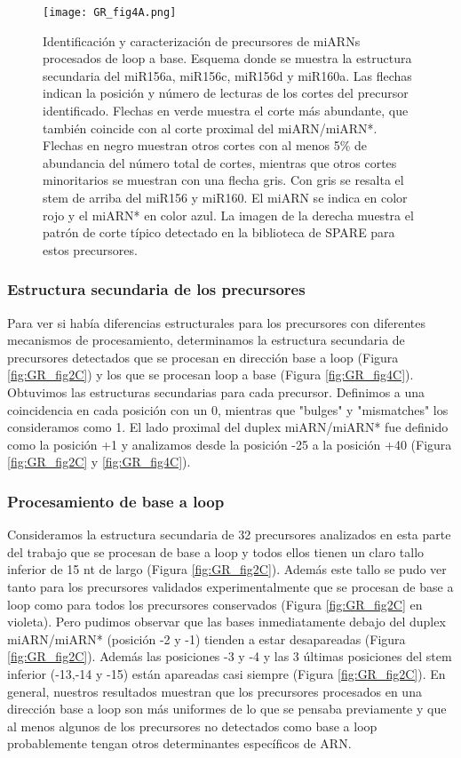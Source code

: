 \begin{figure}[htbp!] 
    \centering    
    \texttt{[image: GR\_fig4A.png]}
    \caption[Identificación y caracterización de precursores de miARNs procesados de loop a base]{Identificación y caracterización de precursores de miARNs procesados de loop a base. 
    Esquema donde se muestra la estructura secundaria del miR156a, miR156c, miR156d y miR160a.
    Las flechas indican la posición y número de lecturas de los cortes del precursor identificado.
    Flechas en verde muestra el corte más abundante, que también coincide con al corte proximal del miARN/miARN*.
    Flechas en negro muestran otros cortes con al menos 5\% de abundancia del número total de cortes, mientras que otros cortes minoritarios se muestran con una flecha gris.
    Con gris se resalta el stem de arriba del miR156 y miR160. El miARN se indica en color rojo y el miARN* en color azul.
    La imagen de la derecha muestra el patrón de corte típico detectado en la biblioteca de SPARE para estos precursores.
}
    \label{fig:GR_fig4A}
\end{figure}

\subsubsection{Estructura secundaria de los precursores}
Para ver si había diferencias estructurales para los precursores con diferentes mecanismos de procesamiento, determinamos la estructura secundaria de precursores detectados que se procesan en dirección base a loop (Figura \ref{fig:GR_fig2C}) y los que se procesan loop a base (Figura \ref{fig:GR_fig4C}).
Obtuvimos las estructuras secundarias para cada precursor.
Definimos a una coincidencia en cada posición con un 0, mientras que "bulges" y "mismatches" los consideramos como 1.
El lado proximal del duplex miARN/miARN* fue definido como la posición +1 y analizamos desde la posición -25 a la posición +40 (Figura \ref{fig:GR_fig2C} y \ref{fig:GR_fig4C}). 

\subsubsection{Procesamiento de base a loop}

Consideramos la estructura secundaria de 32 precursores analizados en esta parte del trabajo que se procesan de base a loop y todos ellos tienen un claro tallo inferior de 15 nt de largo (Figura \ref{fig:GR_fig2C}).
Además este tallo se pudo ver tanto para los precursores validados experimentalmente que se procesan de base a loop como para todos los precursores conservados (Figura \ref{fig:GR_fig2C} en violeta).
Pero pudimos observar que las bases inmediatamente debajo del duplex miARN/miARN* (posición -2 y -1) tienden a estar desapareadas (Figura \ref{fig:GR_fig2C}).
Además las posiciones -3 y -4 y las 3 últimas posiciones del stem inferior (-13,-14 y -15) están apareadas casi siempre (Figura \ref{fig:GR_fig2C}).
En general, nuestros resultados muestran que los precursores procesados en una dirección base a loop son más uniformes de lo que se pensaba previamente y que al menos algunos de los precursores no detectados como base a loop probablemente tengan otros determinantes específicos de ARN.

